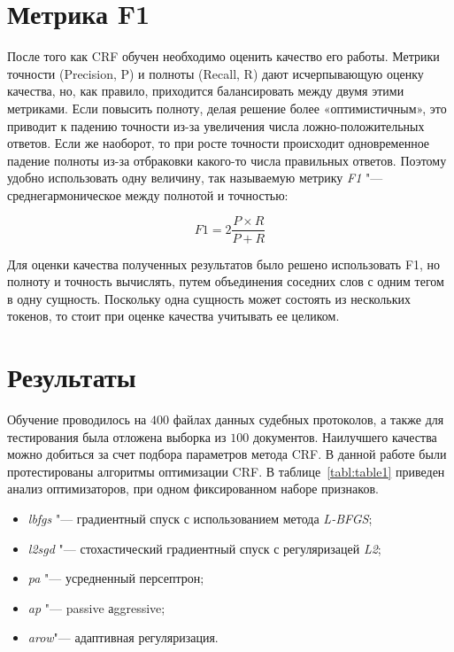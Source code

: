\documentclass{csmathnotes}
\begin{document}
\section*{Метрика F1}
После того как CRF обучен необходимо оценить качество его работы. Метрики точности (Precision, P) и полноты (Recall, R) дают исчерпывающую оценку качества, но, как правило, приходится балансировать между двумя этими метриками.
Если повысить полноту, делая решение более «оптимистичным», это приводит к падению точности из-за увеличения числа ложно-положительных ответов.
Если же наоборот, то при росте точности происходит одновременное падение полноты из-за отбраковки какого-то числа правильных ответов.
Поэтому удобно использовать одну величину, так называемую метрику \emph{F1} "--- среднегармоническое между полнотой и точностью:

\begin{equation}
F1 = 2\frac{P\times R}{P + R} 
\end{equation}

Для оценки качества полученных результатов было решено использовать F1, но полноту и точность вычислять, путем объединения соседних слов с одним тегом в одну сущность.
Поскольку одна сущность может состоять из нескольких токенов, то стоит при оценке качества учитывать ее целиком. 

\section*{Результаты}
Обучение проводилось на $400$ файлах данных судебных протоколов, а также для тестирования была отложена выборка из $100$ документов. Наилучшего качества можно добиться за счет подбора параметров метода CRF. В данной работе были протестированы алгоритмы оптимизации CRF. В таблице~\ref{tabl:table1} приведен анализ оптимизаторов, при одном фиксированном наборе признаков. 

\begin{itemize}
    \item \emph{lbfgs} "--- градиентный спуск с использованием метода 
    \emph{L-BFGS};
    \item \emph{l2sgd} "--- стохастический  градиентный спуск \newline с регуляризацей \emph{L2};
    \item \emph{pa} "--- усредненный персептрон;
    \item \emph{ap} "--- passive аggressive;
    \item \emph{arow}"--- адаптивная регуляризация.
\end{itemize}
\end{document}
